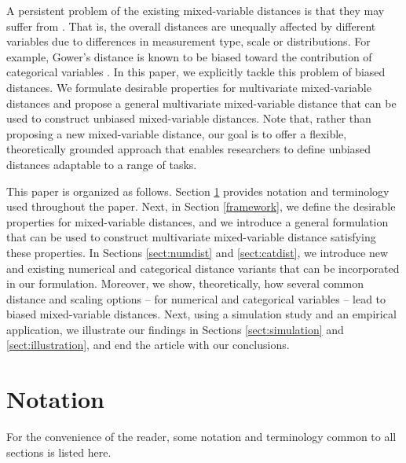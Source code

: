 \documentclass[12pt]{article}
\begin{document}
A persistent problem of the existing mixed-variable distances is that they may suffer from . That is, the overall distances are unequally affected by different variables due to differences in measurement type, scale or distributions. For example, Gower's distance is known to be biased toward the contribution of categorical variables \parencite{HennigLiao2013,foss2016semiparametric}. In this paper, we explicitly tackle this problem of biased distances. We formulate desirable properties for multivariate mixed-variable distances and propose a general multivariate mixed-variable distance that can be used to construct unbiased mixed-variable distances. Note that, rather than proposing a new mixed-variable distance, our goal is to offer a flexible, theoretically grounded approach that enables researchers to define unbiased distances adaptable to a range of tasks.

This paper is organized as follows. Section \ref{notation} provides notation and terminology used throughout the paper. Next, in Section \ref{framework}, we define the desirable properties for mixed-variable distances, and we introduce a general formulation that can be used to construct multivariate mixed-variable distance satisfying these properties. In Sections \ref{sect:numdist} and \ref{sect:catdist}, we introduce new and existing numerical and categorical distance variants that can be incorporated in our formulation. Moreover, we show, theoretically, how several common distance and scaling options -- for numerical and categorical variables -- lead to biased mixed-variable distances. Next, using a simulation study and an empirical application, we illustrate our findings in Sections \ref{sect:simulation} and \ref{sect:illustration}, and end the article with our conclusions.

\section{Notation} \label{notation}
For the convenience of the reader, some notation and terminology common to all sections is listed here.
\end{document}
